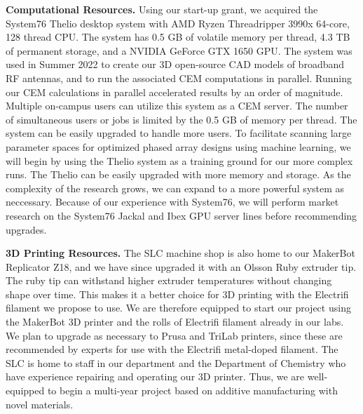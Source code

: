 \documentclass[10pt]{amsart}
\theoremstyle{definition}
\numberwithin{equation}{section}
\begin{document}
\textbf{Computational Resources.} Using our start-up grant, we acquired the System76 Thelio desktop system with AMD Ryzen Threadripper 3990x 64-core, 128 thread CPU.  The system has 0.5 GB of volatile memory per thread, 4.3 TB of permanent storage, and a NVIDIA GeForce GTX 1650 GPU.  The system was used in Summer 2022 to create our 3D open-source CAD models of broadband RF antennas, and to run the associated CEM computations in parallel.  Running our CEM calculations in parallel accelerated results by an order of magnitude.  Multiple on-campus users can utilize this system as a CEM server.  The number of simultaneous users or jobs is limited by the 0.5 GB of memory per thread.  The system can be easily upgraded to handle more users.  To facilitate scanning large parameter spaces for optimized phased array designs using machine learning, we will begin by using the Thelio system as a training ground for our more complex runs.  The Thelio can be easily upgraded with more memory and storage.  As the complexity of the research grows, we can expand to a more powerful system as neccessary.  Because of our experience with System76, we will perform market research on the System76 Jackal and Ibex GPU server lines before recommending upgrades.  

\textbf{3D Printing Resources.}  The SLC machine shop is also home to our MakerBot Replicator Z18, and we have since upgraded it with an Olsson Ruby extruder tip.  The ruby tip can withstand higher extruder temperatures without changing shape over time.  This makes it a better choice for 3D printing with the Electrifi filament we propose to use.  We are therefore equipped to start our project using the MakerBot 3D printer and the rolls of Electrifi filament already in our labs.  We plan to upgrade as necessary to Prusa and TriLab printers, since these are recommended by experts for use with the Electrifi metal-doped filament.  The SLC is home to staff in our department and the Department of Chemistry who have experience repairing and operating our 3D printer.  Thus, we are well-equipped to begin a multi-year project based on additive manufacturing with novel materials. 
\end{document}
